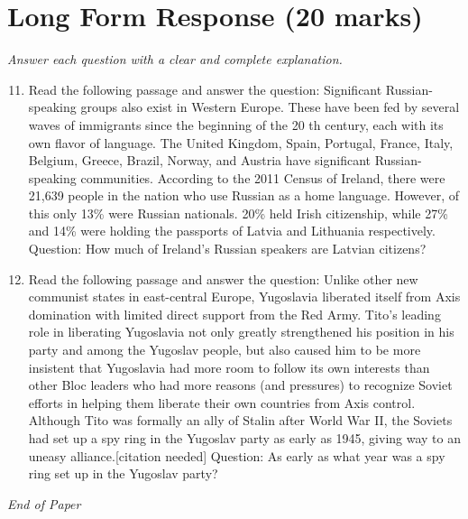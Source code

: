 \documentclass[12pt]{article}
\begin{document}
\section*{Long Form Response (20 marks)}
\textit{Answer each question with a clear and complete explanation.}
\begin{enumerate}[label=\arabic*.]
\setcounter{enumi}{10}
\item Read the following passage and answer the question: Significant Russian-speaking groups also exist in Western Europe. These have been fed by several waves of immigrants since the beginning of the 20 th century, each with its own flavor of language. The United Kingdom, Spain, Portugal, France, Italy, Belgium, Greece, Brazil, Norway, and Austria have significant Russian-speaking communities. According to the 2011 Census of Ireland, there were 21,639 people in the nation who use Russian as a home language. However, of this only 13\% were Russian nationals. 20\% held Irish citizenship, while 27\% and 14\% were holding the passports of Latvia and Lithuania respectively. Question: How much of Ireland's Russian speakers are Latvian citizens?
\item Read the following passage and answer the question: Unlike other new communist states in east-central Europe, Yugoslavia liberated itself from Axis domination with limited direct support from the Red Army. Tito's leading role in liberating Yugoslavia not only greatly strengthened his position in his party and among the Yugoslav people, but also caused him to be more insistent that Yugoslavia had more room to follow its own interests than other Bloc leaders who had more reasons (and pressures) to recognize Soviet efforts in helping them liberate their own countries from Axis control. Although Tito was formally an ally of Stalin after World War II, the Soviets had set up a spy ring in the Yugoslav party as early as 1945, giving way to an uneasy alliance.[citation needed] Question: As early as what year was a spy ring set up in the Yugoslav party?
\end{enumerate}

\vfill
\noindent\textit{End of Paper}
\end{document}
